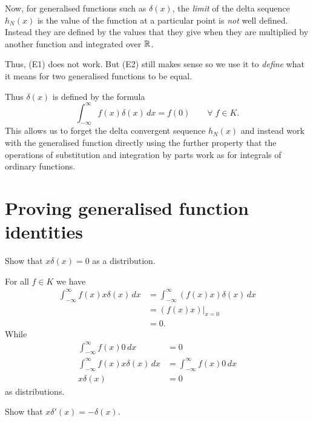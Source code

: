 Now, for generalised functions such as $\delta(x)$,
the \emph{limit} of the delta sequence $h_N(x)$ is the value
of the function at a particular point is \emph{not} well defined.
Instead they are defined by the values that they give when they are
multiplied by another function and integrated over $\mathbb{R}$.

Thus, (E1) does not work.
But (E2) still makes sense so we use it to \emph{define} what it means
for two generalised functions to be equal.

Thus $\delta(x)$ is defined by the formula 
\[
    \int_{-\infty}^{\infty} f(x) \delta(x) \,dx
    = f(0)
    \qquad \forall\; f \in K.
\]
This allows us to forget the delta convergent sequence $h_N(x)$
and instead work with the generalised function directly
using the further property that the operations of substitution
and integration by parts work as for integrals of ordinary functions.

\section{Proving generalised function identities}

\begin{example}
    Show that $x \delta(x) = 0$ as a distribution.
\end{example}

\begin{solution}
    For all $f \in K$ we have
    \begin{align*}
        \int_{-\infty}^{\infty} f(x) x \delta(x) \,dx
        &= \int_{-\infty}^{\infty} (f(x) x) \delta(x) \,dx \\
        &= \left(f(x) x\right) \rvert_{x = 0} \\
        &= 0.
    \end{align*}
    While
    \begin{align*}
        \int_{-\infty}^{\infty} f(x) 0 \,dx &= 0 \\
        \int_{-\infty}^{\infty} f(x) x \delta(x) \,dx 
        &= \int_{-\infty}^{\infty} f(x) 0 \,dx \\
        x \delta(x) &= 0
    \end{align*}
    as distributions.
\end{solution}

\begin{example}
    Show that $x \delta'(x) = -\delta(x)$.
\end{example}

